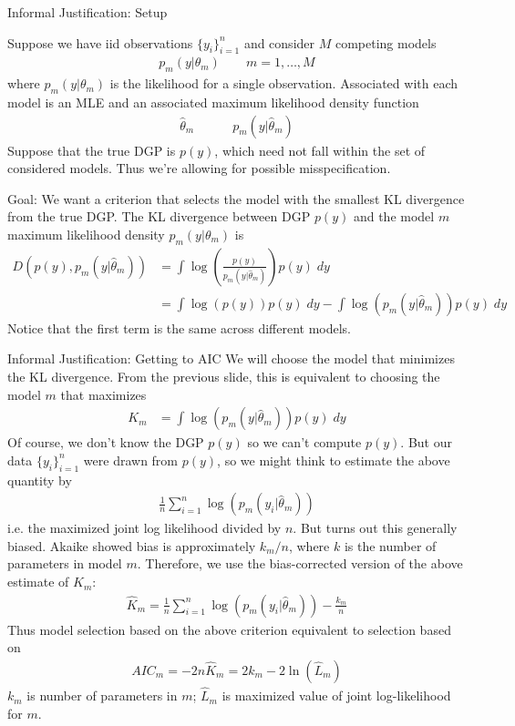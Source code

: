 \documentclass[aspectratio=169, handout]{beamer}
\begin{document}
{\footnotesize
\begin{frame}{Informal Justification: Setup}

Suppose we have iid observations $\{y_i\}_{i=1}^n$ and consider $M$
\alert{competing models}
\begin{align*}
  p_m(y|\theta_m)
  \qquad
  m=1,\ldots,M
\end{align*}
where $p_m(y|\theta_m)$ is the likelihood for a \alert{single}
observation.
Associated with each model is an MLE and an associated maximum
likelihood density function
\begin{align*}
  \hat{\theta}_m
  \qquad
  \quad
  p_m(y|\hat{\theta}_m)
\end{align*}
Suppose that the \alert{true DGP} is $p(y)$, which \alert{need not} fall
within the set of considered models.
Thus we're allowing for possible \alert{misspecification}.

\alert{Goal}:
We want a criterion that selects the model with the smallest KL
divergence from the true DGP.
The KL divergence between DGP $p(y)$ and the model $m$ maximum
likelihood density $p_m(y|\theta_m)$ is
\begin{align*}
  D(p(y),p_m(y|\hat{\theta}_m))
  &=
  \int
  \log\left(
  \frac{p(y)}{p_m(y|\hat{\theta}_m)}
  \right)
  p(y)
  \;
  dy
  \\
  &=
  \int
  \log(p(y))
  p(y)
  \;
  dy
  -
  \int
  \log(p_m(y|\hat{\theta}_m))
  p(y)
  \;
  dy
\end{align*}
Notice that the first term is \alert{the same} across different models.
\end{frame}
}


{\scriptsize
\begin{frame}{Informal Justification: Getting to AIC}
We will choose the model that minimizes the KL divergence.
From the previous slide, this is equivalent to choosing the model $m$
that maximizes
\begin{align*}
  K_m
  &=
  \int
  \log(p_m(y|\hat{\theta}_m))
  p(y)
  \;
  dy
\end{align*}
Of course, we don't know the DGP $p(y)$ so we can't compute $p(y)$.
But our data $\{y_i\}_{i=1}^n$ were drawn from $p(y)$, so we might think
to estimate the above quantity by
\begin{align*}
  \frac{1}{n}
  \sum_{i=1}^n
  \log(p_m(y_i|\hat{\theta}_m))
\end{align*}
i.e. the maximized joint log likelihood divided by $n$.
But turns out this generally biased.
Akaike showed bias is approximately $k_m/n$, where $k$ is the number
of parameters in model $m$.
Therefore, we use the bias-corrected version of the above estimate
of $K_m$:
\begin{align*}
  \hat{K}_m
  =
  \frac{1}{n}
  \sum_{i=1}^n
  \log(p_m(y_i|\hat{\theta}_m))
  -
  \frac{k_m}{n}
\end{align*}
Thus model selection based on the above criterion equivalent
to selection based on
\begin{align*}
  AIC_m
  =
  -
  2n
  \hat{K}_m
  =
  2k_m
  - 2\ln(\hat{L}_m)
\end{align*}
$k_m$ is number of parameters in $m$; $\hat{L}_m$ is
maximized value of joint log-likelihood for $m$.
\end{frame}
}
\end{document}
